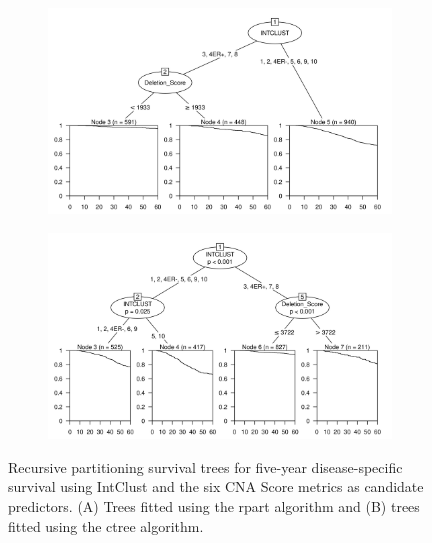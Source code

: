 \begin{figure}[!h]
\centering

\vspace{0.5cm}

\begin{subfigure}{\textwidth}
\subcaption{}
\includegraphics[width=1\textwidth]{../figures/Chapter_3/PartyKit_Survival_Score_FiveYearDSS_INTCLUST.png}
\end{subfigure}

\vspace{2cm}

\begin{subfigure}{\textwidth}
\subcaption{}
\includegraphics[width=1\textwidth]{../figures/Chapter_3/Ctree_Survival_Score_FiveYearDSS_INTCLUST.png}
\end{subfigure}

\vspace{0.5cm}

\caption[Recursive partitioning survival trees for five-year disease-specific survival using IntClust and the six CNA Score metrics as candidate predictors.]{Recursive partitioning survival trees for five-year disease-specific survival using IntClust and the six CNA Score metrics as candidate predictors. (A) Trees fitted using the rpart algorithm and (B) trees fitted using the ctree algorithm.}
\label{fig:INTCLUST_CNA_Score_FiveYearDSS}
\end{figure}

